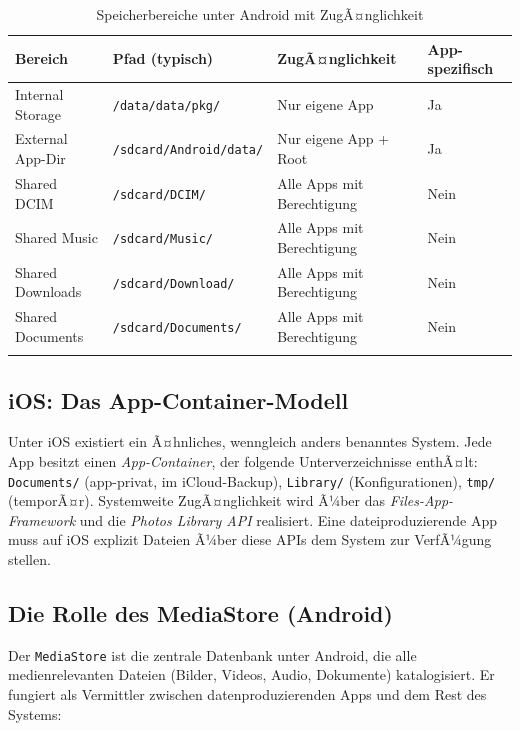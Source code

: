 ﻿\documentclass[12pt, a4paper]{article}
\begin{document}
\begin{longtable}{@{}p{3.5cm} p{3.5cm} p{4.5cm} p{2cm}@{}}
\toprule
\textbf{Bereich} & \textbf{Pfad (typisch)} & \textbf{ZugÃ¤nglichkeit} & \textbf{App-spezifisch} \\
\midrule
\endhead
Internal Storage & \texttt{/data/data/pkg/} & Nur eigene App & Ja \\
External App-Dir & \texttt{/sdcard/Android/data/} & Nur eigene App + Root & Ja \\
Shared DCIM & \texttt{/sdcard/DCIM/} & Alle Apps mit Berechtigung & Nein \\
Shared Music & \texttt{/sdcard/Music/} & Alle Apps mit Berechtigung & Nein \\
Shared Downloads & \texttt{/sdcard/Download/} & Alle Apps mit Berechtigung & Nein \\
Shared Documents & \texttt{/sdcard/Documents/} & Alle Apps mit Berechtigung & Nein \\
\bottomrule
\caption{Speicherbereiche unter Android mit ZugÃ¤nglichkeit}
\label{tab:android-speicher}
\end{longtable}

\subsection{iOS: Das App-Container-Modell}

Unter iOS existiert ein Ã¤hnliches, wenngleich anders benanntes System. Jede App besitzt
einen \emph{App-Container}, der folgende Unterverzeichnisse enthÃ¤lt: \texttt{Documents/}
(app-privat, im iCloud-Backup), \texttt{Library/} (Konfigurationen), \texttt{tmp/}
(temporÃ¤r). Systemweite ZugÃ¤nglichkeit wird Ã¼ber das \emph{Files-App-Framework} und
die \emph{Photos Library API} realisiert. Eine dateiproduzierende App muss auf iOS
explizit Dateien Ã¼ber diese APIs dem System zur VerfÃ¼gung stellen.

\subsection{Die Rolle des MediaStore (Android)}

Der \texttt{MediaStore} ist die zentrale Datenbank unter Android, die alle medienrelevanten
Dateien (Bilder, Videos, Audio, Dokumente) katalogisiert. Er fungiert als Vermittler
zwischen datenproduzierenden Apps und dem Rest des Systems:
\end{document}
